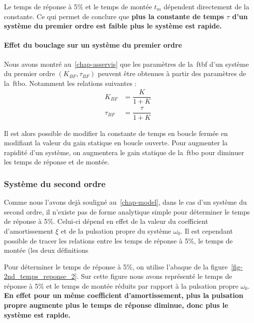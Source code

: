 Le temps de réponse à 5\% et le temps de montée $t_m$ dépendent 
directement de la constante. Ce qui permet de conclure que 
\textbf{plus la constante de temps $\tau$ d'un système du premier
ordre est faible plus le système est rapide.}

\paragraph{Effet du bouclage sur un système du premier ordre}
Nous avons montré au~\cref{chap-asservis} que les paramètres de 
la~\gls{ftbf} d'un système du premier ordre $(K_{BF},\tau_{BF})$ peuvent 
être obtenues à partir des paramètres de la~\gls{ftbo}. Notamment les relations
suivantes :
\begin{align*}
       K_{BF}&=\dfrac{K}{1+K}\\
    \tau_{BF}&=\dfrac{\tau}{1+K}
\end{align*}

Il est alors possible de modifier la constante de temps en boucle fermée en 
modifiant la valeur du gain statique en boucle ouverte. Pour augmenter
la rapidité d'un système, on augmentera le gain statique de la~\gls{ftbo} pour
diminuer les temps de réponse et de montée.

\subsubsection{Système du second ordre}
Comme nous l'avons dejà souligné au~\cref{chap-model}, dans le cas d'un système  
du second ordre, il n'existe pas de forme analytique simple pour déterminer 
le temps de réponse à 5\%. Celui-ci dépend en effet de la valeur du coefficient 
d'amortissement $\xi$ et de la pulsation propre du système $\omega_0$.
Il est cependant possible de tracer les relations entre les temps de réponse
à 5\%, le temps de montée (les deux définitions 

Pour déterminer le temps de réponse à 5\%, on utilise l'abaque de la 
figure~\cref{fig-2nd_temps_reponse_2}. Sur cette figure nous avons représenté
le temps de réponse à 5\% et le temps de montée réduits par rapport à la
pulsation propre $\omega_0$. \textbf{En effet pour un même coefficient 
d'amortissement, plus la pulsation propre augmente plus le temps de réponse 
diminue, donc plus le système est rapide.}


